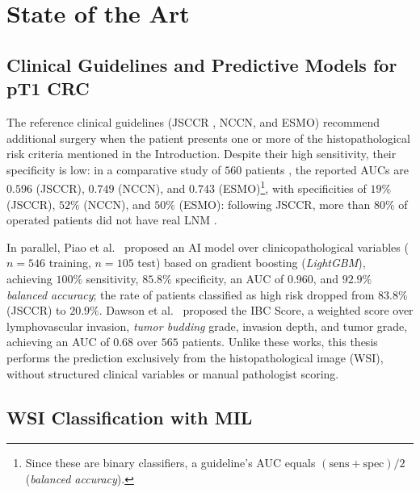 \documentclass[10pt,a4paper,twocolumn,twoside]{article}
\begin{document}
\section{State of the Art}

\subsection{Clinical Guidelines and Predictive Models for pT1 CRC}
\label{sec:guidelines-sota}

The reference clinical guidelines (JSCCR \cite{jsccr2019}, NCCN, and
ESMO) recommend additional surgery when the patient
presents one or more of the histopathological risk criteria mentioned in the
Introduction. Despite their high sensitivity, their specificity
is low: in a comparative study of $560$ patients
\cite{tanino2024comparative}, the reported AUCs are $0.596$ (JSCCR),
$0.749$ (NCCN), and $0.743$ (ESMO)\footnote{Since these are binary classifiers, a guideline's AUC
equals $(\text{sens}+\text{spec})/2$ (\textit{balanced accuracy}).},
with specificities of $19\%$ (JSCCR), $52\%$ (NCCN), and $50\%$ (ESMO):
following JSCCR, more than $80\%$ of operated patients did not have real
LNM \cite{tanino2024comparative,zaffalon2023}.

In parallel, Piao et al.~\cite{piao2023ai} proposed an AI
model over clinicopathological variables ($n\!=\!546$ training,
$n\!=\!105$ test) based on gradient boosting (\textit{LightGBM}),
achieving $100\%$ sensitivity, $85.8\%$ specificity, an AUC of
$0.960$, and $92.9\%$ \textit{balanced accuracy}; the rate of
patients classified as high risk dropped from $83.8\%$ (JSCCR)
to $20.9\%$. Dawson et al.~\cite{dawson2024budding} proposed
the IBC Score, a weighted score over lymphovascular invasion, \textit{tumor budding}
grade, invasion depth, and tumor grade,
achieving an AUC of $0.68$ over $565$ patients. Unlike these
works, this thesis performs the prediction exclusively from the
histopathological image (WSI), without structured clinical variables
or manual pathologist scoring.

\subsection{WSI Classification with MIL}
\end{document}
